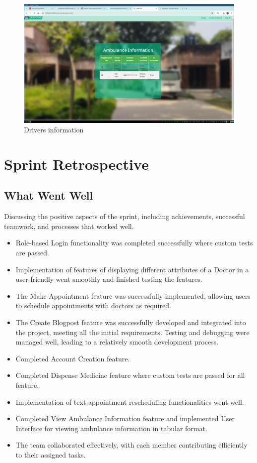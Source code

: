 \documentclass[a4paper,12pt]{article}
\begin{document}
\begin{figure}[H]
    \centering
    \includegraphics[width=1\textwidth]{images/sprintoutput09.png}
    \caption{Drivers information}
    \label{fig:driverinformation}
\end{figure}

\newpage
\section{Sprint Retrospective}
\subsection{What Went Well}
Discussing the positive aspects of the sprint, including achievements, successful teamwork, and processes that worked well.
\begin{itemize}
    \item Role-based Login functionality was completed successfully where custom tests are passed.
    \item Implementation of features of displaying different attributes of a Doctor in a user-friendly went smoothly and finished testing the features.
    \item The Make Appointment feature was successfully implemented, allowing users to schedule appointments with doctors as required.
    \item The Create Blogpost feature was successfully developed and integrated into the project, meeting all the initial requirements. Testing and debugging were managed well, leading to a relatively smooth development process.
    \item Completed Account Creation feature.
    \item Completed Dispense Medicine feature where custom tests are passed for all feature.
    \item Implementation of text appointment rescheduling functionalities went well.
    \item Completed View Ambulance Information feature and implemented User Interface for viewing ambulance information in tabular format.
    \item The team collaborated effectively, with each member contributing efficiently to their assigned tasks.
\end{itemize}
\end{document}
